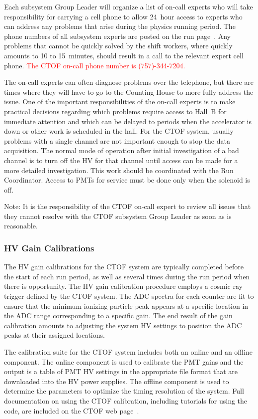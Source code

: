\documentclass[12pt]{article}
\begin{document}
Each subsystem Group Leader will organize a list of on-call experts who will take responsibility 
for carrying a cell phone to allow 24~hour access to experts who can address any problems that arise 
during the physics running period. The phone numbers of all subsystem experts are posted on the run 
page~\cite{run-page}. Any problems that cannot be quickly solved by the shift workers, where quickly 
amounts to 10 to 15~minutes, should result in a call to the relevant expert cell phone. 
\textcolor{red}{The CTOF on-call phone number is (757)-344-7204.} 

The on-call experts can often diagnose problems over the telephone, but there are times where they
will have to go to the Counting House to more fully address the issue. One of the important
responsibilities of the on-call experts is to make practical decisions regarding which problems 
require access to Hall~B for immediate attention and which can be delayed to periods when the 
accelerator is down or other work is scheduled in the hall. For the CTOF system, usually problems 
with a single channel are not important enough to stop the data acquisition. The normal mode of 
operation after initial investigation of a bad channel is to turn off the HV for that channel 
until access can be made for a more detailed investigation. This work should be coordinated with
the Run Coordinator. Access to PMTs for service must be done only when the solenoid is off.

Note: It is the responsibility of the CTOF on-call expert to review all issues that they cannot
resolve with the CTOF subsystem Group Leader as soon as is reasonable.

\subsubsection{HV Gain Calibrations}
\label{gain-calib}

The HV gain calibrations for the CTOF system are typically completed before the start of each run
period, as well as several times during the run period when there is opportunity. The HV gain 
calibration procedure employs a cosmic ray trigger defined by the CTOF system. The ADC spectra for 
each counter are fit to ensure that the minimum ionizing particle peak appears at a specific 
location in the ADC range corresponding to a specific gain. The end result of the gain calibration 
amounts to adjusting the system HV settings to position the ADC peaks at their assigned locations.

The calibration suite for the CTOF system includes both an online and an offline component. The
online component is used to calibrate the PMT gains and the output is a table of PMT HV settings
in the appropriate file format that are downloaded into the HV power supplies. The offline component 
is used to determine the parameters to optimize the timing resolution of the system. Full 
documentation on using the CTOF calibration, including tutorials for using the code, are included 
on the CTOF web page~\cite{ctof-web}.
\end{document}
